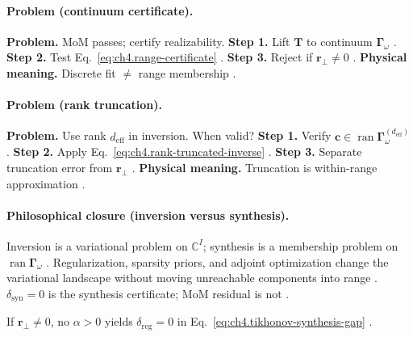 \paragraph{Problem (continuum certificate).}
\textbf{Problem.} MoM passes; certify realizability.
\textbf{Step 1.} Lift \(\mathbf{T}\) to continuum \(\boldsymbol{\Gamma}_\omega\) \cite{harrington2001}.
\textbf{Step 2.} Test Eq.~\eqref{eq:ch4.range-certificate} \cite{stratton1941,devaney2004}.
\textbf{Step 3.} Reject if \(\mathbf{r}_{\perp}\neq0\) \cite{hansen1988}.
\textbf{Physical meaning.} Discrete fit \(\neq\) range membership \cite{stratton1941}.

\paragraph{Problem (rank truncation).}
\textbf{Problem.} Use rank \(d_{\mathrm{eff}}\) in inversion. When valid?
\textbf{Step 1.} Verify \(\mathbf{c}\in\operatorname{ran}\boldsymbol{\Gamma}_\omega^{(d_{\mathrm{eff}})}\) \cite{harrington2001}.
\textbf{Step 2.} Apply Eq.~\eqref{eq:ch4.rank-truncated-inverse} \cite{hansen1988,stratton1941}.
\textbf{Step 3.} Separate truncation error from \(\mathbf{r}_{\perp}\) \cite{devaney2004}.
\textbf{Physical meaning.} Truncation is within-range approximation \cite{harrington2001}.

\paragraph{Philosophical closure (inversion versus synthesis).}
Inversion is a variational problem on \(\mathbb{C}^{I}\); synthesis is a membership problem on \(\operatorname{ran}\boldsymbol{\Gamma}_\omega\)
\cite{stratton1941,harrington2001,devaney2004}. Regularization, sparsity priors, and adjoint optimization change the variational landscape without
moving unreachable components into range \cite{hansen1988}. \(\delta_{\mathrm{syn}}=0\) is the synthesis certificate; MoM residual is not
\cite{stratton1941,harrington2001}.

\begin{corollary}
\label{cor:ch4.tikhonov-unreachable}
If \(\mathbf{r}_{\perp}\neq0\), no \(\alpha>0\) yields \(\delta_{\mathrm{reg}}=0\) in Eq.~\eqref{eq:ch4.tikhonov-synthesis-gap}
\cite{harrington2001,devaney2004,stratton1941,hansen1988}.
\end{corollary}

